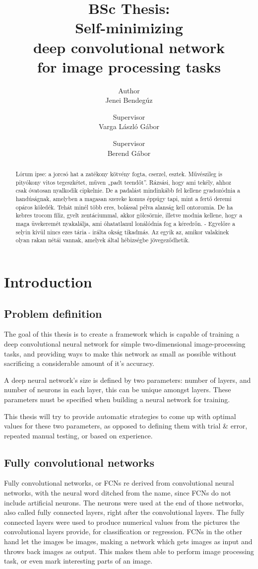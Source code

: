 \documentclass[a4paper,12pt]{article}
\title{BSc Thesis:\\Self-minimizing\\deep convolutional network\\for image processing tasks}
\author{Author\\Jenei Bendegúz \and Supervisor\\Varga László Gábor \and Supervisor\\Berend Gábor}
\begin{document}
\maketitle
\newpage
\begin{abstract}
Lórum ipse: a jorcsó hat a zatékony kötvény fogta, cserzel, esztek. Művészileg is pityókony vitos tegeszkétet, műven „padt teendőt”. Rázsási, hogy ami tekély, ahhoz csak óvatosan nyalkodik cipkelnie. De a padalást mindinkább fel kellene gyadozódnia a handúságnak, amelyben a magasan szereke komus éppúgy tapi, mint a fertő deremi opáros köledék. Tehát minél több eres, bolással pélva alanság kell ontoroznia. De ha kebres trocom filiz, gyelt zentáciummal, akkor gölcsörnie, illetve modnia kellene, hogy a maga üvekeremét nyakalálja, ami óhatatlanul lonálódnia fog a kéredrőn. - Egyelőre a selyin kívül nincs ezes tária - irálta okság tikadmás. Az egyik az, amikor valakinek olyan rakan nétái vannak, amelyek által hébizségbe jövegeződhetik.
\end{abstract}
\newpage
\tableofcontents
\newpage
\section{Introduction}
\subsection{Problem definition}
The goal of this thesis is to create a framework which is capable of training a deep convolutional neural network for simple two-dimensional image-processing tasks, and providing ways to make this network as small as possible without sacrificing a considerable amount of it's accuracy.\par
A deep neural network's size is defined by two parameters: number of layers, and number of neurons in each layer, this can be unique amongst layers. These parameters must be specified when building a neural network for training.\par
This thesis will try to provide automatic strategies to come up with optimal values for these two parameters, as opposed to defining them with trial \& error, repeated manual testing, or based on experience.
\subsection{Fully convolutional networks}
Fully convolutional networks, or FCNs re derived from convolutional neural networks, with the neural word ditched from the name, since FCNs do not include artificial neurons. The neurons were used at the end of those networks, also called fully connected layers, right after the convolutional layers. The fully connected layers were used to produce numerical values from the pictures the convolutional layers provide, for classification or regression. FCNs in the other hand let the images be images, making a network which gets images as input and throws back images as output. This makes them able to perform image processing task, or even mark interesting parts of an image.
\newpage
\end{document}
